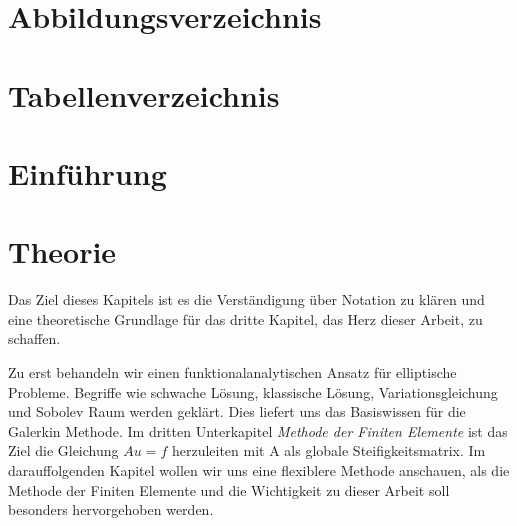 \documentclass[12pt,a4paper]{scrartcl}
\numberwithin{equation}{section}
\begin{document}


\newpage
\setcounter{page}{2}
\renewcommand{\listfigurename}{}
\section*{Abbildungsverzeichnis}
\listoffigures






\newpage
\setcounter{page}{3}
\section*{Tabellenverzeichnis}



\newpage
\pagestyle{plain}



\setcounter{page}{1}
\section{Einführung}






\newpage

\section{Theorie}
Das Ziel dieses Kapitels ist es die Verständigung über Notation zu klären und eine theoretische Grundlage für das dritte Kapitel, das Herz dieser Arbeit, zu schaffen.

Zu erst behandeln wir einen funktionalanalytischen Ansatz für elliptische Probleme. Begriffe wie schwache Lösung, klassische Lösung, Variationsgleichung und Sobolev Raum werden geklärt. Dies liefert uns das Basiswissen für die Galerkin Methode. 
Im dritten Unterkapitel \textit{Methode der Finiten Elemente} ist das Ziel die Gleichung $Au=f$ herzuleiten mit A als globale Steifigkeitsmatrix.
Im darauffolgenden Kapitel wollen wir uns eine flexiblere Methode anschauen, als die Methode der Finiten Elemente und die Wichtigkeit zu dieser Arbeit soll besonders hervorgehoben werden.
\end{document}
